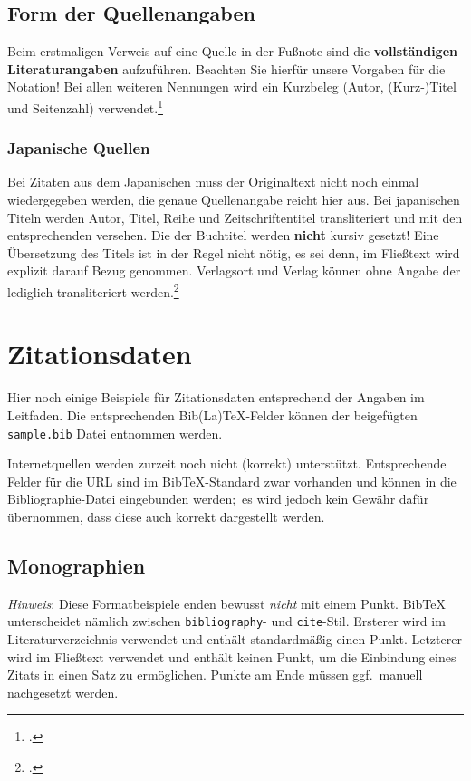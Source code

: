 \documentclass{japuzk}
\newcommand{\bibresourcename}{sample.bib}
\begin{document}
\subsection{Form der Quellenangaben}
Beim erstmaligen Verweis auf eine Quelle in der Fußnote sind die \textbf{vollständigen Literaturangaben} aufzuführen. Beachten Sie hierfür unsere Vorgaben für die Notation! Bei allen weiteren Nennungen wird ein Kurzbeleg (Autor, (Kurz-)Titel und Seitenzahl) verwendet.\footcite[Vgl.][10]{muster:quellen}

\subsubsection{Japanische Quellen}
Bei Zitaten aus dem Japanischen muss der Originaltext nicht noch einmal wiedergegeben werden, die genaue Quellenangabe reicht hier aus. Bei japanischen Titeln werden Autor, Titel, Reihe und Zeitschriftentitel transliteriert und mit den entsprechenden  versehen. Die  der Buchtitel werden \textbf{nicht} kursiv gesetzt! Eine Übersetzung des Titels ist in der Regel nicht nötig, es sei denn, im Fließtext wird explizit darauf Bezug genommen. Verlagsort und Verlag können ohne Angabe der  lediglich transliteriert werden.\footcite[Vgl.][112]{suzuki:ronbun}

\printbibliography[heading=bibintoc]

\appendix
\newrefsection

\section{Zitationsdaten}

Hier noch einige Beispiele für Zitationsdaten entsprechend der Angaben im Leitfaden. Die entsprechenden Bib(La)TeX-Felder können der beigefügten \texttt{\bibresourcename} Datei entnommen werden.

Internetquellen werden zurzeit noch nicht (korrekt) unterstützt. Entsprechende Felder für die URL sind im BibTeX-Standard zwar vorhanden und können in die Bibliographie-Datei eingebunden werden;\ es wird jedoch kein Gewähr dafür übernommen, dass diese auch korrekt dargestellt werden.

\subsection{Monographien}

\textit{Hinweis}: Diese Formatbeispiele enden bewusst \emph{nicht} mit einem Punkt. BibTeX unterscheidet nämlich zwischen \texttt{bibliography}- und \texttt{cite}-Stil. Ersterer wird im Literaturverzeichnis verwendet und enthält standardmäßig einen Punkt. Letzterer wird im Fließtext verwendet und enthält keinen Punkt, um die Einbindung eines Zitats in einen Satz zu ermöglichen. Punkte am Ende müssen ggf.\ manuell nachgesetzt werden.
\end{document}
